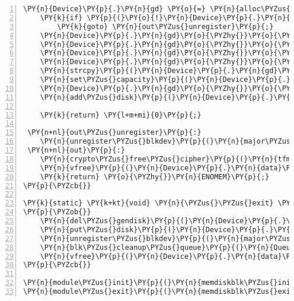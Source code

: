 \begin{Verbatim}[commandchars=\\\{\},numbers=left,firstnumber=1,stepnumber=1]
	\PY{n}{Device}\PY{p}{.}\PY{n}{gd} \PY{o}{=} \PY{n}{alloc\PYZus{}disk}\PY{p}{(}\PY{l+m+mi}{16}\PY{p}{)}\PY{p}{;}
	\PY{k}{if} \PY{p}{(}\PY{o}{!}\PY{n}{Device}\PY{p}{.}\PY{n}{gd}\PY{p}{)}
		\PY{k}{goto} \PY{n}{out\PYZus{}unregister}\PY{p}{;}
	\PY{n}{Device}\PY{p}{.}\PY{n}{gd}\PY{o}{\PYZhy{}}\PY{o}{\PYZgt{}}\PY{n}{major} \PY{o}{=} \PY{n}{major\PYZus{}num}\PY{p}{;}
	\PY{n}{Device}\PY{p}{.}\PY{n}{gd}\PY{o}{\PYZhy{}}\PY{o}{\PYZgt{}}\PY{n}{first\PYZus{}minor} \PY{o}{=} \PY{l+m+mi}{0}\PY{p}{;}
	\PY{n}{Device}\PY{p}{.}\PY{n}{gd}\PY{o}{\PYZhy{}}\PY{o}{\PYZgt{}}\PY{n}{fops} \PY{o}{=} \PY{o}{\PYZam{}}\PY{n}{memdiskblk\PYZus{}ops}\PY{p}{;}
	\PY{n}{Device}\PY{p}{.}\PY{n}{gd}\PY{o}{\PYZhy{}}\PY{o}{\PYZgt{}}\PY{n}{private\PYZus{}data} \PY{o}{=} \PY{o}{\PYZam{}}\PY{n}{Device}\PY{p}{;}
	\PY{n}{strcpy}\PY{p}{(}\PY{n}{Device}\PY{p}{.}\PY{n}{gd}\PY{o}{\PYZhy{}}\PY{o}{\PYZgt{}}\PY{n}{disk\PYZus{}name}\PY{p}{,} \PY{l+s}{\PYZdq{}}\PY{l+s}{memdiskblk0}\PY{l+s}{\PYZdq{}}\PY{p}{)}\PY{p}{;}
	\PY{n}{set\PYZus{}capacity}\PY{p}{(}\PY{n}{Device}\PY{p}{.}\PY{n}{gd}\PY{p}{,} \PY{n}{nsectors}\PY{p}{)}\PY{p}{;}
	\PY{n}{Device}\PY{p}{.}\PY{n}{gd}\PY{o}{\PYZhy{}}\PY{o}{\PYZgt{}}\PY{n}{queue} \PY{o}{=} \PY{n}{Queue}\PY{p}{;}
	\PY{n}{add\PYZus{}disk}\PY{p}{(}\PY{n}{Device}\PY{p}{.}\PY{n}{gd}\PY{p}{)}\PY{p}{;}

	\PY{k}{return} \PY{l+m+mi}{0}\PY{p}{;}

 \PY{n+nl}{out\PYZus{}unregister}\PY{p}{:}
	\PY{n}{unregister\PYZus{}blkdev}\PY{p}{(}\PY{n}{major\PYZus{}num}\PY{p}{,} \PY{l+s}{\PYZdq{}}\PY{l+s}{memdiskblk}\PY{l+s}{\PYZdq{}}\PY{p}{)}\PY{p}{;}
 \PY{n+nl}{out}\PY{p}{:}
	\PY{n}{crypto\PYZus{}free\PYZus{}cipher}\PY{p}{(}\PY{n}{tfm}\PY{p}{)}\PY{p}{;}
	\PY{n}{vfree}\PY{p}{(}\PY{n}{Device}\PY{p}{.}\PY{n}{data}\PY{p}{)}\PY{p}{;}
	\PY{k}{return} \PY{o}{\PYZhy{}}\PY{n}{ENOMEM}\PY{p}{;}
\PY{p}{\PYZcb{}}

\PY{k}{static} \PY{k+kt}{void} \PY{n}{\PYZus{}\PYZus{}exit} \PY{n+nf}{memdiskblk\PYZus{}exit}\PY{p}{(}\PY{k+kt}{void}\PY{p}{)}
\PY{p}{\PYZob{}}
	\PY{n}{del\PYZus{}gendisk}\PY{p}{(}\PY{n}{Device}\PY{p}{.}\PY{n}{gd}\PY{p}{)}\PY{p}{;}
	\PY{n}{put\PYZus{}disk}\PY{p}{(}\PY{n}{Device}\PY{p}{.}\PY{n}{gd}\PY{p}{)}\PY{p}{;}
	\PY{n}{unregister\PYZus{}blkdev}\PY{p}{(}\PY{n}{major\PYZus{}num}\PY{p}{,} \PY{l+s}{\PYZdq{}}\PY{l+s}{memdiskblk}\PY{l+s}{\PYZdq{}}\PY{p}{)}\PY{p}{;}
	\PY{n}{blk\PYZus{}cleanup\PYZus{}queue}\PY{p}{(}\PY{n}{Queue}\PY{p}{)}\PY{p}{;}
	\PY{n}{vfree}\PY{p}{(}\PY{n}{Device}\PY{p}{.}\PY{n}{data}\PY{p}{)}\PY{p}{;}
\PY{p}{\PYZcb{}}

\PY{n}{module\PYZus{}init}\PY{p}{(}\PY{n}{memdiskblk\PYZus{}init}\PY{p}{)}\PY{p}{;}
\PY{n}{module\PYZus{}exit}\PY{p}{(}\PY{n}{memdiskblk\PYZus{}exit}\PY{p}{)}\PY{p}{;}
\end{Verbatim}
